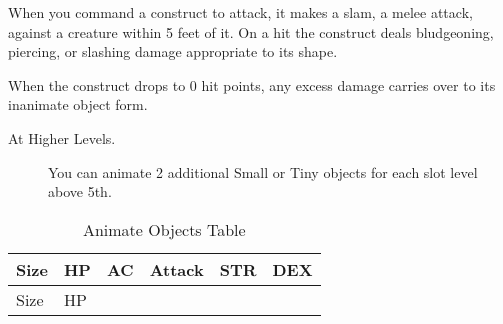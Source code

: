 When you command a construct to attack, it makes a slam, a melee attack,
against a creature within 5 feet of it. On a hit the construct deals
bludgeoning, piercing, or slashing damage appropriate to its shape.

When the construct drops to 0 hit points, any excess damage carries over
to its inanimate object form.

\begin{description}
\item[At Higher Levels.]
You can animate 2 additional Small or Tiny objects for each slot level
above 5th.
\end{description}

\begin{longtable}[]{@{}
  >{\raggedright\arraybackslash}p{}
  >{\raggedright\arraybackslash}p{}
  >{\raggedright\arraybackslash}p{}
  >{\raggedright\arraybackslash}p{}
  >{\raggedright\arraybackslash}p{}
  >{\raggedright\arraybackslash}p{}@{}}
\caption{Animate Objects Table}\tabularnewline
\toprule\noalign{}
\begin{minipage}[b]{\linewidth}\raggedright
Size
\end{minipage} & \begin{minipage}[b]{\linewidth}\centering
HP
\end{minipage} & \begin{minipage}[b]{\linewidth}\centering
AC
\end{minipage} & \begin{minipage}[b]{\linewidth}\raggedright
Attack
\end{minipage} & \begin{minipage}[b]{\linewidth}\centering
STR
\end{minipage} & \begin{minipage}[b]{\linewidth}\centering
DEX
\end{minipage} \\
\midrule\noalign{}
\endfirsthead
\toprule\noalign{}
\begin{minipage}[b]{\linewidth}\raggedright
Size
\end{minipage} & \begin{minipage}[b]{\linewidth}\centering
HP
\end{minipage} & \begin{minipage}[b]{\linewidth}\centering

\end{minipage}
\end{longtable}
